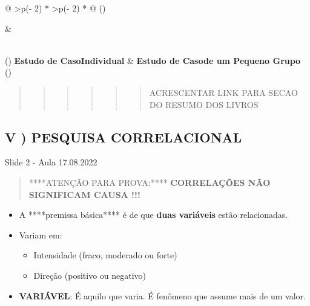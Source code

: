 \documentclass[
]{book}
\providecommand{\tightlist}{%
  \setlength{\itemsep}{0pt}\setlength{\parskip}{0pt}}
\begin{document}
\begin{longtable}[]{@{}
  >{\centering\arraybackslash}p{(\columnwidth - 2\tabcolsep) * }
  >{\centering\arraybackslash}p{(\columnwidth - 2\tabcolsep) * }@{}}
\toprule()
\begin{minipage}[b]{\linewidth}\centering
\end{minipage} & \begin{minipage}[b]{\linewidth}\centering
\end{minipage} \\
\midrule()
\endhead
\textbf{Estudo de CasoIndividual} & \textbf{Estudo de Casode um Pequeno Grupo} \\
\bottomrule()
\end{longtable}

\begin{quote}
\begin{quote}
\begin{quote}
\begin{quote}
\begin{quote}
\begin{quote}
ACRESCENTAR LINK PARA SECAO DO RESUMO DOS LIVROS
\end{quote}
\end{quote}
\end{quote}
\end{quote}
\end{quote}
\end{quote}

\hypertarget{v-pesquisa-correlacional}{%
\subsection{V ) PESQUISA CORRELACIONAL}\label{v-pesquisa-correlacional}}

Slide 2 - Aula 17.08.2022

\begin{quote}
****ATENÇÃO PARA PROVA:**** \textbf{CORRELAÇÕES NÃO SIGNIFICAM CAUSA !!!}
\end{quote}

\begin{itemize}
\tightlist
\item
  A ****premissa básica**** é de que \textbf{duas variáveis} estão relacionadas.
\item
  Variam em:

  \begin{itemize}
  \tightlist
  \item
    Intensidade (fraco, moderado ou forte)
  \item
    Direção (positivo ou negativo)
  \end{itemize}
\item
  \textbf{VARIÁVEL}: É aquilo que varia. É fenômeno que assume mais de um valor.
\end{itemize}
\end{document}
